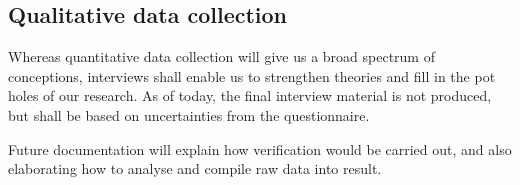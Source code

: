 \documentclass[ProjectPlan_innit.tex]{subfiles}
\begin{document}
\subsection{Qualitative data collection}
Whereas quantitative data collection will give us a broad spectrum of conceptions, interviews shall enable us to strengthen theories and fill in the pot holes of our research. As of today, the final interview material is not produced, but shall be based on uncertainties from the questionnaire.

\smallskip
Future documentation will explain how verification would be carried out, and also elaborating how to analyse and compile raw data into result.
\end{document}
